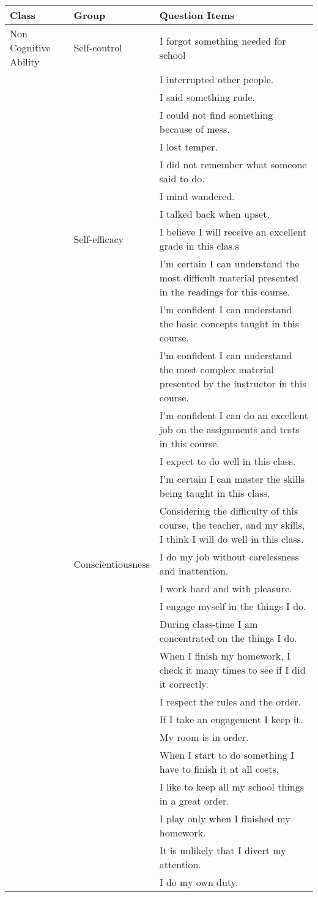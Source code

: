 \begin{tabular}{lll}
\hline \hline
Class & Group & Question Items\\
\hline
Non Cognitive Ability & Self-control & I forgot something needed for school\\
 &  & I interrupted other people.\\
 &  & I said something rude.\\
 &  & I could not find something because of mess.\\
 &  & I lost temper.\\
 &  & I did not remember what someone said to do.\\
 &  & I mind wandered.\\
 &  & I talked back when upset.\\
 & Self-efficacy & I believe I will receive an excellent grade in this clas.s\\
 &  & I'm certain I can understand the most difficult material presented in the readings for this course.\\
 &  & I'm confident I can understand the basic concepts taught in this course.\\
 &  & I'm confident I can understand the most complex material presented by the instructor in this course.\\
 &  & I'm confident I can do an excellent job on the assignments and tests in this course.\\
 &  & I expect to do well in this class.\\
 &  & I'm certain I can master the skills being taught in this class.\\
 &  & Considering the difficulty of this course, the teacher, and my skills, I think I will do well in this class.\\
 & Conscientiousness & I do my job without carelessness and inattention.\\
 &  & I work hard and with pleasure.\\
 &  & I engage myself in the things I do.\\
 &  & During class-time I am concentrated on the things I do.\\
 &  & When I finish my homework, I check it many times to see if I did it correctly.\\
 &  & I respect the rules and the order.\\
 &  & If I take an engagement I keep it.\\
 &  & My room is in order.\\
 &  & When I start to do something I have to finish it at all costs.\\
 &  & I like to keep all my school things in a great order.\\
 &  & I play only when I finished my homework.\\
 &  & It is unlikely that I divert my attention.\\
 &  & I do my own duty.\\
 \hline \hline
\end{tabular}
